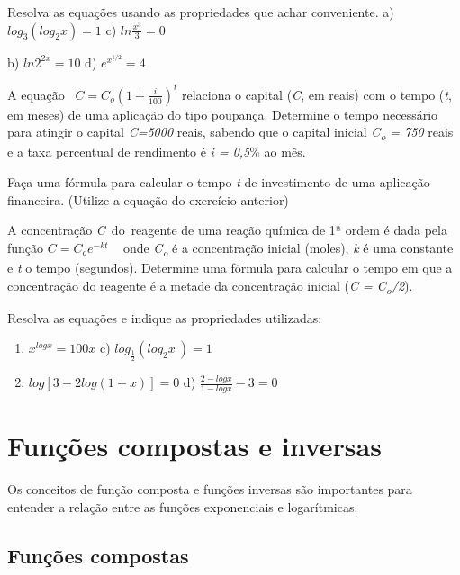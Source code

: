 \begin{exercicios}
	\exitem{} Resolva as equações usando as propriedades que achar conveniente.
    a)~  \( log_{3} \left( log_{2}x \right) =1 \) \quad \quad \quad c)  \( ln\frac{x^{3}}{3}= 0 _{} \) ~ 

    b)  \( ln2^{2x}=10 \) \quad \quad \quad d)  \( e^{x^{1/2}}=4 \) 

	\exitem{} A equação~  \( C=C_{o} \left( 1+\frac{i}{100} \right) ^{t} \)  relaciona o capital (\textit{C}, em reais) com o tempo (\textit{t}, em meses) de uma aplicação do tipo poupança. Determine o tempo necessário para atingir o capital \textit{C=5000} reais, sabendo que o capital inicial \textit{C\textsubscript{o} = 750} reais e a taxa percentual de rendimento é \textit{i = 0,5$\%$  }ao mês.

	\exitem{} Faça uma fórmula para calcular o tempo \textit{t} de investimento de uma aplicação financeira. (Utilize a equação do exercício anterior)

	\exitem{} A concentração \textit{C}~do~reagente de uma reação química de 1ª ordem é dada pela função \( C=C_{o}e^{-kt} \) ~ onde \textit{C\textsubscript{o}} é a concentração inicial (moles), \textit{k} é uma constante e \textit{t} o tempo (segundos). Determine uma fórmula para calcular o tempo em que a concentração do reagente é a metade da concentração inicial (\textit{C = C\textsubscript{o}/2}).

	\exitem{} Resolva as equações e indique as propriedades utilizadas:
    \begin{enumerate}
	    \item  \( x^{logx}=100 x \) \quad \quad \quad c)  \( log_{\frac{1}{2}} \left( log_{2}x~  \right) =1 ^{} \) 

    	\item  \( log \left[ 3-2log \left( 1+x \right)  \right] =0 \) \quad \quad d)  \( \frac{2-logx}{1-logx}-3=0 \) 
    \end{enumerate}

\end{exercicios}

\section{Funções compostas e inversas}

Os conceitos de função composta e funções inversas são importantes para entender a relação entre as funções exponenciais e logarítmicas.

\subsection{Funções compostas}


